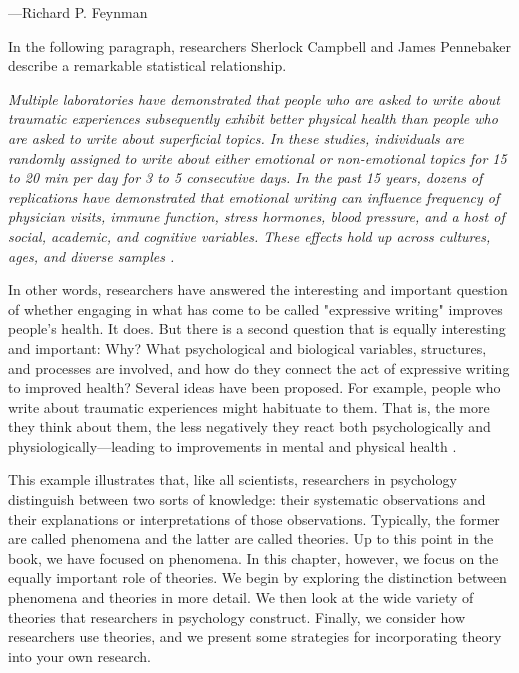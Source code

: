  {---Richard P. Feynman}

In the following paragraph, researchers Sherlock Campbell and James Pennebaker describe a remarkable statistical relationship.

\emph{Multiple laboratories have demonstrated that people who are asked to write about traumatic experiences subsequently exhibit better physical health than people who are asked to write about superficial topics. In these studies, individuals are randomly assigned to write about either emotional or non-emotional topics for 15 to 20 min per day for 3 to 5 consecutive days. In the past 15 years, dozens of replications have demonstrated that emotional writing can influence frequency of physician visits, immune function, stress hormones, blood pressure, and a host of social, academic, and cognitive variables. These effects hold up across cultures, ages, and diverse samples \citep{campbell_secret_2003}.}

In other words, researchers have answered the interesting and important question of whether engaging in what has come to be called "expressive writing" improves people's health. It does. But there is a second question that is equally interesting and important: Why? What psychological and biological variables, structures, and processes are involved, and how do they connect the act of expressive writing to improved health? Several ideas have been proposed. For example, people who write about traumatic experiences might habituate to them. That is, the more they think about them, the less negatively they react both psychologically and physiologically---leading to improvements in mental and physical health \citep{lepore_expressive_2002}.

This example illustrates that, like all scientists, researchers in psychology distinguish between two sorts of knowledge: their systematic observations and their explanations or interpretations of those observations. Typically, the former are called phenomena and the latter are called theories. Up to this point in the book, we have focused on phenomena. In this chapter, however, we focus on the equally important role of theories. We begin by exploring the distinction between phenomena and theories in more detail. We then look at the wide variety of theories that researchers in psychology construct. Finally, we consider how researchers use theories, and we present some strategies for incorporating theory into your own research.

